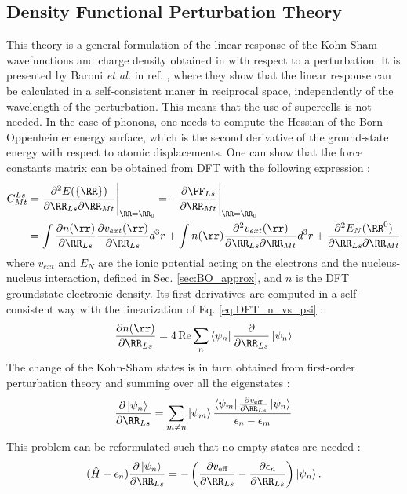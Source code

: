 \subsection{Density Functional Perturbation Theory}
This theory is a general formulation of the linear response of the Kohn-Sham wavefunctions and charge density obtained in  with respect to a perturbation. It is presented by Baroni \textit{et al.} in ref. \cite{baroni2001phonons}, where they show that the linear response can be calculated in a self-consistent maner in reciprocal space, independently of the wavelength of the perturbation. This means that the use of supercells is not needed. In the case of phonons, one needs to compute the Hessian of the Born-Oppenheimer energy surface, which is the second derivative of the ground-state energy with respect to atomic displacements. One can show that the force constants matrix can be obtained from \gls{DFT} with the following expression \cite{gonze1997dynamical} :
\begin{align}
\begin{split}
	C^{Ls}_{Mt} &= \frac{\partial^2 E(\{\RR\})}{\partial\RR_{Ls} \partial \RR_{Mt}} \Biggr|_{\RR=\RR_0} = - \frac{\partial \FF_{Ls}}{\partial \RR_{Mt}} \Biggr|_{\RR=\RR_0} \\
	&= \int \frac{\partial n(\rr)}{\partial \RR_{Ls}} \frac{\partial v_{ext}(\rr)}{\partial \RR_{Ls}} d^3r + \int n(\rr) \frac{\partial^2 v_{ext}(\rr)}{\partial \RR_{Ls} \partial \RR_{Mt}} d^3r + \frac{\partial^2 E_N(\RR^0) }{\partial \RR_{Ls} \partial \RR_{Mt}}
\end{split}
\end{align}
where $v_{ext}$ and $E_N$ are the ionic potential acting on the electrons and the nucleus-nucleus interaction, defined in Sec. \ref{sec:BO_approx}, and $n$ is the \gls{DFT} groundstate electronic density. Its first derivatives are computed in a self-consistent way with the linearization of Eq. \eqref{eq:DFT_n_vs_psi} :
\begin{equation}
	\frac{\partial n(\rr)}{\partial \RR_{Ls}} = 4\Re \sum_n \bra{\psi_n} \frac{\partial}{\partial \RR_{Ls}} \ket{\psi_n}
\end{equation}
The change of the Kohn-Sham states is in turn obtained from first-order perturbation theory and summing over all the eigenstates :
\begin{equation}
	\frac{\partial\ket{\psi_n}}{\partial \RR_{Ls}} = \sum_{m\neq n} \ket{\psi_m} \frac{\bra{\psi_m} \tfrac{\partial v_{\text{eff}}}{\partial\RR_{Ls}}\ket{\psi_n}}{\epsilon_n - \epsilon_m}
\end{equation}
This problem can be reformulated such that no empty states are needed :
\begin{equation}
	(\hat{H} - \epsilon_n) \frac{\partial\ket{\psi_n}}{\partial \RR_{Ls}} = - \left(\frac{\partial v_{\text{eff}}}{\partial\RR_{Ls}} - \frac{\partial \epsilon_n}{\partial\RR_{Ls}}  \right) \ket{\psi_n}.
\end{equation}

